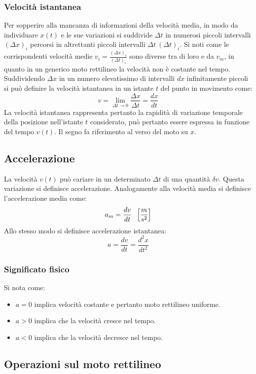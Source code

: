 \documentclass[class=book, crop=false, oneside, 12pt]{standalone}
\begin{document}
    \subsubsection{Velocit\`a istantanea}
    Per sopperire alla mancanza di informazioni della velocit\`a media, in modo da individuare \(x(t)\) e le sue variazioni si suddivide \(\Delta t\) in numerosi piccoli intervalli \((\Delta x)_i\) percorsi in altrettanti piccoli intervalli $\Delta t\ (\Delta t)_i$.
    Si noti come le corrispondenti velocit\`a medie $v_i=\frac{(\Delta x)_i}{(\Delta t)_i}$ sono diverse tra di loro e da $v_m$, in quanto in un generico moto rettilineo la velocit\`a non \`e costante nel tempo.
    Suddividendo $\Delta x$ in un numero elevatissimo di intervalli $dx$ infinitamente piccoli si pu\`o definire la velocit\`a istantanea in un istante $t$ del punto in movimento come:
    \begin{equation*}
      v=\lim\limits_{\Delta t\rightarrow 0}\dfrac{\Delta x}{\Delta t}=\dfrac{dx}{dt}
    \end{equation*}
    La velocit\`a istantanea rappresenta pertanto la rapidit\`a di variazione temporale della posizione nell'istante $t$ considerato, pu\`o pertanto essere espressa in funzione del tempo $v(t)$.
    Il segno fa riferimento al verso del moto su $x$.
  \subsection{Accelerazione}
  La velocit\`a $v(t)$ pu\`o cariare in un determinato $\Delta t$ di una quantit\`a $\delta v$.
  Questa variazione si definisce accelerazione.
  Analogamente alla velocit\`a media si definisce l'accelerazione media come:
  $$a_m=\dfrac{dv}{dt}\hspace{0.2cm} \left[\dfrac{m}{s^2}\right]$$
  Allo stesso modo si definisce accelerazione istantanea:
  $$a=\dfrac{dv}{dt}=\dfrac{d^2x}{dt^2}$$
    \subsubsection{Significato fisico}
    Si nota come:
    \begin{itemize}
      \item $a=0$ implica velocit\`a costante e pertanto moto rettilineo uniforme.
      \item $a>0$ implica che la velocit\`a cresce nel tempo.
      \item $a<0$ implica che la velocit\`a decresce nel tempo.
    \end{itemize}
  \subsection{Operazioni sul moto rettilineo}
\end{document}

